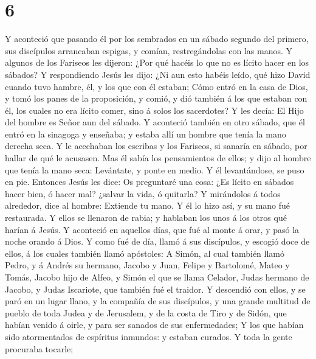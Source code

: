 \hypertarget{section-5}{%
\section{6}\label{section-5}}

 Y aconteció que pasando él por los sembrados en un sábado
segundo del primero, sus discípulos arrancaban espigas, y comían,
restregándolas con las manos.  Y algunos de los Fariseos les
dijeron: ¿Por qué hacéis lo que no es lícito hacer en los sábados?
 Y respondiendo Jesús les dijo: ¿Ni aun esto habéis leído,
qué hizo David cuando tuvo hambre, él, y los que con él estaban;
 Cómo entró en la casa de Dios, y tomó los panes de la
proposición, y comió, y dió también á los que estaban con él, los cuales
no era lícito comer, sino á solos los sacerdotes?  Y les
decía: El Hijo del hombre es Señor aun del sábado.  Y
aconteció también en otro sábado, que él entró en la sinagoga y
enseñaba; y estaba allí un hombre que tenía la mano derecha seca.
 Y le acechaban los escribas y los Fariseos, si sanaría en
sábado, por hallar de qué le acusasen.  Mas él sabía los
pensamientos de ellos; y dijo al hombre que tenía la mano seca:
Levántate, y ponte en medio. Y él levantándose, se puso en pie.
 Entonces Jesús les dice: Os preguntaré una cosa: ¿Es lícito
en sábados hacer bien, ó hacer mal? ¿salvar la vida, ó quitarla?
 Y mirándolos á todos alrededor, dice al hombre: Extiende
tu mano. Y él lo hizo así, y su mano fué restaurada.  Y
ellos se llenaron de rabia; y hablaban los unos á los otros qué harían á
Jesús.  Y aconteció en aquellos días, que fué al monte á
orar, y pasó la noche orando á Dios.  Y como fué de día,
llamó á sus discípulos, y escogió doce de ellos, á los cuales también
llamó apóstoles:  A Simón, al cual también llamó Pedro, y á
Andrés su hermano, Jacobo y Juan, Felipe y Bartolomé, 
Mateo y Tomás, Jacobo hijo de Alfeo, y Simón el que se llama Celador,
 Judas hermano de Jacobo, y Judas Iscariote, que también
fué el traidor.  Y descendió con ellos, y se paró en un
lugar llano, y la compañía de sus discípulos, y una grande multitud de
pueblo de toda Judea y de Jerusalem, y de la costa de Tiro y de Sidón,
que habían venido á oirle, y para ser sanados de sus enfermedades;
 Y los que habían sido atormentados de espíritus inmundos:
y estaban curados.  Y toda la gente procuraba tocarle;
